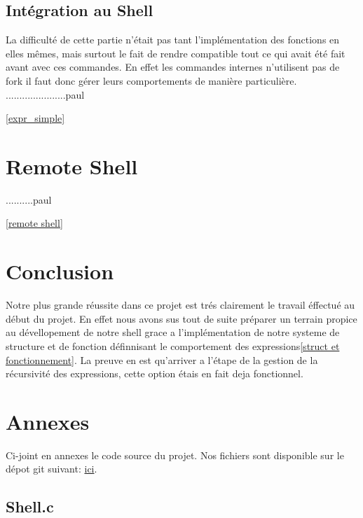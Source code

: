 \documentclass[12pt]{article}
\begin{document}
 \subsection{Intégration au Shell}
 
 La difficulté de cette partie n'était pas tant l'implémentation des fonctions en elles mêmes,
 mais surtout le fait de rendre compatible tout ce qui avait été fait avant avec ces commandes.
 En effet les commandes internes n'utilisent pas de fork il faut donc gérer leurs comportements
 de manière particulière.
 ......................paul
 
 \ref{expr_simple}
 

\newpage
\section{Remote Shell}

..........paul


\ref{remote shell}





\newpage
\section{Conclusion}

Notre plus grande réussite dans ce projet est trés clairement le travail éffectué au
début du projet. En effet nous avons sus tout de suite préparer un terrain propice au
dévellopement de notre shell grace a l'implémentation de notre systeme de structure et
de fonction définnisant le comportement des expressions\ref{struct et fonctionnement}.
La preuve en est qu'arriver a l'étape de la gestion de la récursivité des expressions, 
cette option étais en fait deja fonctionnel.




\newpage
\section{Annexes}

Ci-joint en annexes le code source du projet. Nos fichiers sont disponible sur le dépot git suivant:
 \href{https://github.com/beziarum/shell.git}{ici}.

 
\subsection{Shell.c}
\label{main}
\begin{alltt}
 
\end{alltt}
\end{document}
